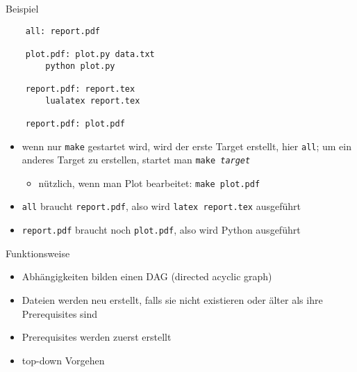 \begin{frame}[fragile]{Beispiel}
  \begin{verbatim}
    all: report.pdf

    plot.pdf: plot.py data.txt
        python plot.py

    report.pdf: report.tex
        lualatex report.tex

    report.pdf: plot.pdf
  \end{verbatim}

  \begin{itemize}
    \item wenn nur \texttt{make} gestartet wird, wird der erste Target erstellt, hier \texttt{all}; um ein anderes Target zu erstellen, startet man \texttt{make \textit{target}}
      \begin{itemize}
        \item nützlich, wenn man Plot bearbeitet: \texttt{make plot.pdf}
      \end{itemize}
    \item \texttt{all} braucht \texttt{report.pdf}, also wird \texttt{latex report.tex} ausgeführt
    \item \texttt{report.pdf} braucht noch \texttt{plot.pdf}, also wird Python ausgeführt
  \end{itemize}
\end{frame}

\begin{frame}{Funktionsweise}
  \begin{center}
  \end{center}

  \begin{itemize}
    \item Abhängigkeiten bilden einen DAG (directed acyclic graph)
    \item Dateien werden neu erstellt, falls sie nicht existieren oder älter als ihre Prerequisites sind
    \item Prerequisites werden zuerst erstellt
    \item top-down Vorgehen
  \end{itemize}
\end{frame}

